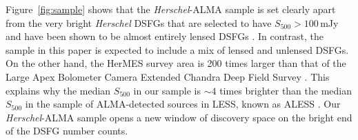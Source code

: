 \documentclass[iop]{emulateapj}
\begin{document}

Figure~\ref{fig:sample} shows that the {\it Herschel}-ALMA sample is set
clearly apart from the very bright {\it Herschel} DSFGs that are selected to
have $S_{500} > 100 \, $mJy and have been shown to be almost entirely lensed
DSFGs \citep{Negrello:2010fk, Wardlow:2013lr, Bussmann:2013lr}.  In contrast,
the sample in this paper is expected to include a mix of lensed and unlensed
DSFGs.  On the other hand, the HerMES survey area is 200 times larger than that
of the Large Apex Bolometer Camera Extended Chandra Deep Field Survey
\citep[LESS][]{Weis:2009ly}.  This explains why the median $S_{500}$ in our
sample is $\sim4$ times brighter than the median $S_{500}$ in the sample of
ALMA-detected sources in LESS, known as ALESS \citep{Hodge:2013qy}.  Our {\it
Herschel}-ALMA sample opens a new window of discovery space on the bright end
of the DSFG number counts.
\end{document}
